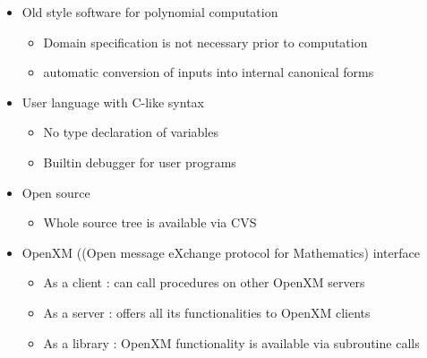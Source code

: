 \setlength{\parskip}{10pt}

\begin{slide}{}
\begin{center}
\end{center}
\end{slide}

\begin{slide}{}

\begin{itemize}
\item Old style software for polynomial computation

\begin{itemize}
\item Domain specification is not necessary prior to computation
\item automatic conversion of inputs into internal canonical forms
\end{itemize}

\item User language with C-like syntax

\begin{itemize}
\item No type declaration of variables
\item Builtin debugger for user programs
\end{itemize}

\item Open source

\begin{itemize}
\item Whole source tree is available via CVS
\end{itemize}

\item OpenXM ((Open message eXchange protocol for Mathematics) interface

\begin{itemize}
\item As a client : can call procedures on other OpenXM servers
\item As a server : offers all its functionalities to OpenXM clients
\item As a library : OpenXM functionality is available via subroutine calls
\end{itemize}
\end{itemize}
\end{slide}

